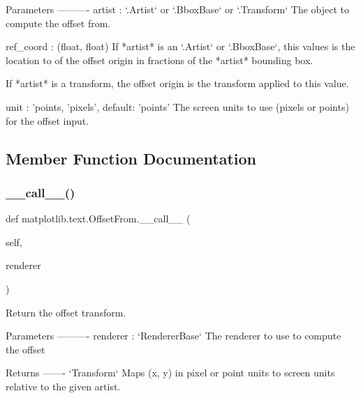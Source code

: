 \begin{DoxyVerb}Parameters
----------
artist : `.Artist` or `.BboxBase` or `.Transform`
    The object to compute the offset from.

ref_coord : (float, float)
    If *artist* is an `.Artist` or `.BboxBase`, this values is
    the location to of the offset origin in fractions of the
    *artist* bounding box.

    If *artist* is a transform, the offset origin is the
    transform applied to this value.

unit : {'points, 'pixels'}, default: 'points'
    The screen units to use (pixels or points) for the offset input.
\end{DoxyVerb}
 

\subsection{Member Function Documentation}
\mbox{\label{classmatplotlib_1_1text_1_1OffsetFrom_a974c14ca806ca869c87b888e5fc20b9a}} 
\subsubsection{\texorpdfstring{\+\_\+\+\_\+call\+\_\+\+\_\+()}{\_\_call\_\_()}}
{\footnotesize\ttfamily def matplotlib.\+text.\+Offset\+From.\+\_\+\+\_\+call\+\_\+\+\_\+ (\begin{DoxyParamCaption}\item[{}]{self,  }\item[{}]{renderer }\end{DoxyParamCaption})}

\begin{DoxyVerb}Return the offset transform.

Parameters
----------
renderer : `RendererBase`
    The renderer to use to compute the offset

Returns
-------
`Transform`
    Maps (x, y) in pixel or point units to screen units
    relative to the given artist.
\end{DoxyVerb}
 \mbox{\label{classmatplotlib_1_1text_1_1OffsetFrom_a8f92c414160af4f3da555fd08fc0b30c}} 
